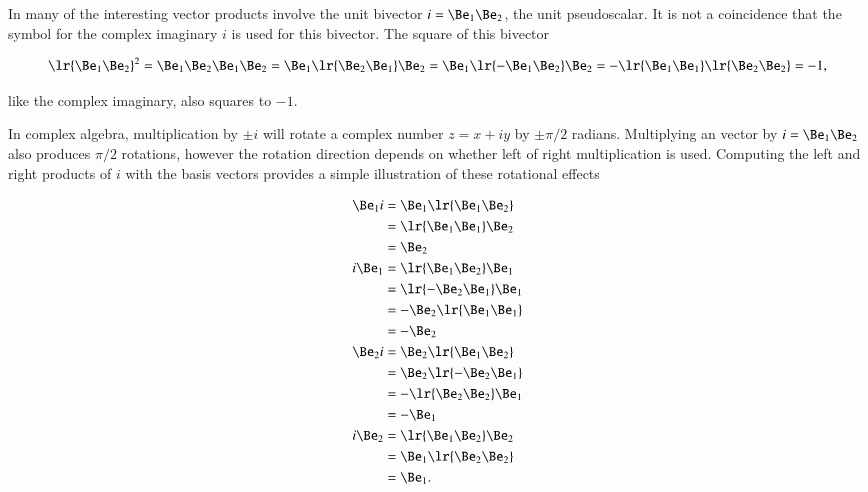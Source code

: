 %
%
In  many of the interesting vector products involve the unit bivector \( i = \Be_1 \Be_2 \), the  unit pseudoscalar.
It is not a coincidence that the symbol for the complex imaginary \( i \) is used for this bivector.
The square of this bivector

\begin{dmath}\label{eqn:SimpleProducts2:220}
   \lr{ \Be_1 \Be_2 }^2
   =
   \Be_1 \Be_2
   \Be_1 \Be_2
   =
   \Be_1 \lr{ \Be_2 \Be_1 } \Be_2
   =
   \Be_1 \lr{ -\Be_1 \Be_2 } \Be_2
   =
   -\lr{ \Be_1 \Be_1 }
   \lr{ \Be_2 \Be_2 }
   = -1,
\end{dmath}

like the complex imaginary, also squares to \( -1 \).

In complex algebra, multiplication by \( \pm i \) will rotate a complex number \( z = x + i y \) by \( \pm \pi/2 \) radians.
Multiplying an  vector by \( i = \Be_1 \Be_2 \) also produces \( \pi/2 \) rotations, however the rotation direction depends on whether left of right multiplication is used.
Computing the left and right products of \( i \) with the  basis vectors provides a
simple illustration of these rotational effects

\begin{dmath}\label{eqn:SimpleProducts2:180}
\begin{aligned}
   \Be_1 i &= \Be_1 \lr{ \Be_1 \Be_2 } \\
           &= \lr{ \Be_1 \Be_1 } \Be_2 \\
           &= \Be_2 \\
   i \Be_1 &= \lr{ \Be_1 \Be_2 } \Be_1 \\
           &= \lr{ -\Be_2 \Be_1 } \Be_1 \\
           &= -\Be_2 \lr{ \Be_1 \Be_1 } \\
           &= -\Be_2 \\
   \Be_2 i &= \Be_2 \lr{ \Be_1 \Be_2 } \\
           &= \Be_2 \lr{ -\Be_2 \Be_1 } \\
           &= -\lr{ \Be_2 \Be_2 }\Be_1 \\
           &= -\Be_1 \\
   i \Be_2 &= \lr{ \Be_1 \Be_2 } \Be_2 \\
           &= \Be_1 \lr{ \Be_2 \Be_2 } \\
           &= \Be_1.
\end{aligned}
\end{dmath}

